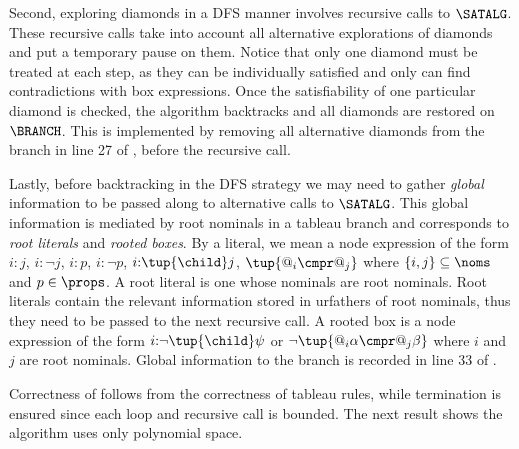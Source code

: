 \documentclass[10pt,a4paper]{amsart}
\theoremstyle{definition}
\theoremstyle{remark}
\begin{document}
\begin{description}
        Second, exploring diamonds in a DFS manner involves recursive calls to $\SATALG$.
        These recursive calls take into account all alternative explorations of diamonds and put a temporary pause on them. Notice that only one diamond must be treated at each step, as they can be individually satisfied and only can find contradictions with box expressions. Once the satisfiability of one particular diamond is checked, the algorithm backtracks and all diamonds are restored on $\BRANCH$. 
        This is implemented by removing all alternative diamonds from the branch in line 27 of , before the recursive call.

        Lastly, before backtracking in the DFS strategy we may need to gather \emph{global} information to be passed along to alternative calls to $\SATALG$.
        This global information %
        is mediated by root nominals in a tableau branch and corresponds to \emph{root literals} and \emph{rooted boxes}.
        By a literal, we mean a node expression of the form $i{:}j$, $i{:}\lnot j$, $i{:}p$, $i{:}\lnot p$, $i{:}\tup{\child}j$, $\tup{@_i \cmpr @_j}$ where $\{i,j\} \subseteq \noms$ and $p \in \props$.
        A root literal is one whose nominals are root nominals.
        Root literals contain the relevant information stored in urfathers of root nominals, thus they need to be passed to the next recursive call.
        A rooted box is a node expression of the form $i{:}\lnot\tup{\child}\psi$ or $\lnot\tup{@_i\alpha \cmpr @_j\beta}$ where $i$ and $j$ are root nominals.
        Global information to the branch is recorded in line 33 of .
\end{description}


Correctness of  follows from the correctness of tableau rules, while termination is ensured since each loop and recursive call is bounded. The next result shows the algorithm uses only polynomial space.
\end{document}
